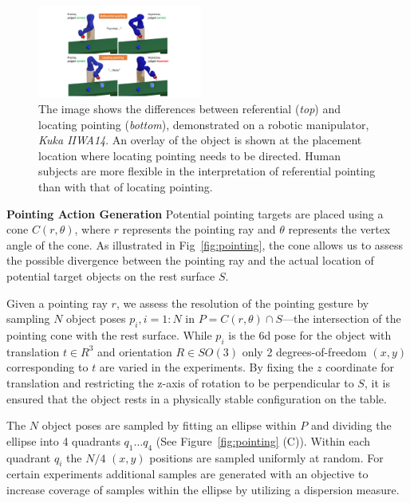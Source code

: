 \documentclass[letterpaper]{article} %
\begin{document}
\begin{figure}[t]
    \centering
    \includegraphics[width=0.48\textwidth]{spatial-referential.pdf}
    \caption{The image shows the differences between referential (\textit{top}) and locating pointing (\textit{bottom}), demonstrated on a robotic manipulator, \textit{Kuka IIWA14}. An overlay of the object is shown at the placement location where locating pointing needs to be directed.  Human subjects are more flexible in the interpretation of  referential pointing than with that of locating pointing.}
    \label{fig:spatial}
\end{figure}

\noindent\textbf{Pointing Action Generation} Potential pointing targets are placed using a cone $C(r, \theta)$, where $r$ represents the pointing ray and $\theta$ represents the vertex angle of the cone. As illustrated in Fig~\ref{fig:pointing}, the cone allows us to assess the possible divergence between the pointing ray and the actual location of potential target objects on the rest surface $S$. 

Given a pointing ray $r$, we assess the resolution of the pointing gesture by sampling $N$ object poses $p_i, i=1:N$ in $P=C(r, \theta) \cap S$---the intersection of the pointing cone with the rest surface.  While $p_i$ is the 6d pose for the object with translation $t \in R^3$ and orientation $R \in SO(3)$ only 2  degrees-of-freedom $(x, y)$ corresponding to $t$ are varied in the experiments. By fixing the $z$ coordinate for translation and restricting the z-axis of rotation to be perpendicular to $S$, it is ensured that the object rests in a physically stable configuration on the table.

The $N$ object poses are sampled by fitting an ellipse within $P$ and dividing the ellipse into 4 quadrants $q_1\ldots q_4$ (See Figure~\ref{fig:pointing} (C)). Within each quadrant $q_i$ the $N/4$ $(x,y)$ positions are sampled uniformly at random. For certain experiments additional samples are generated with an objective to increase coverage of samples within the ellipse by utilizing a dispersion measure.\\
\end{document}
